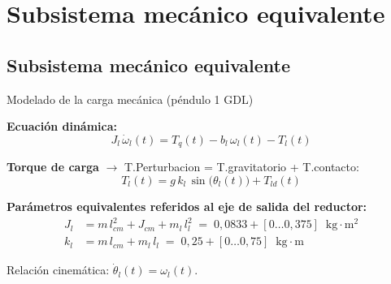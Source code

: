 \documentclass[aspectratio=169,t]{beamer}
\newcommand{\SecPresentacion}{Presentación del problema}
\newcommand{\SecMecanico}{Subsistema mecánico equivalente}
\newcommand{\SecElectromagnetico}{Subsistema electromagnético en coordenadas qd0}
\newcommand{\SecTermico}{Subsistema térmico}
\newcommand{\SecNLGlobal}{Sistema No Lineal Global}
\newcommand{\SecLPV}{Linealización Jacobiana (LPV)}
\newcommand{\SecLTI}{Obtención del modelo LTI equivalente}
\newcommand{\SecAnalisisLTI}{Análisis del modelo LTI aumentado}
\newcommand{\SecDinamica}{Respuesta dinámica en dominio del tiempo}
\newcommand{\SecControlador}{Diseño y análisis del controlador en cascada}
\newcommand{\SecVerifSpecs}{Verificación de desempeño: Especificaciones de operación}
\newcommand{\SecVerifOffset}{Verificación de desempeño: Offset de estado estacionario}
\newcommand{\SecVerifNoIdealidades}{Verificación de desempeño: No idealidades y comportamiento térmico}
\newcommand{\SecDiscretizacion}{Discretización del controlador}
\newcommand{\SecSoftware}{Codificación del software de control}
\newcommand{\AgendaItem}[3]{%
  \ifnum#1=#2
    {\scriptsize\bfseries\color{uncBlue}%
      \hyperlink{sec:#1}{\makebox[2.2em][r]{#1.}\hspace{0.7em}%
      \parbox[t]{0.86\textwidth}{#3}}\par}%
  \else
    {\scriptsize\color{black!26}%
      \hyperlink{sec:#1}{\makebox[2.2em][r]{#1.}\hspace{0.7em}%
      \parbox[t]{0.86\textwidth}{#3}}\par}%
  \fi
  \vspace{0.35mm}%
}
\newcommand{\AgendaBody}[1]{%
    \vspace{3mm}
    {\Large\bfseries\color{uncBlue}Tabla de contenidos\par}
    \vspace{2mm}
    \begin{minipage}{0.94\textwidth}
      \AgendaItem{1}{#1}{\SecPresentacion}
      \AgendaItem{2}{#1}{\SecMecanico}
      \AgendaItem{3}{#1}{\SecElectromagnetico}
      \AgendaItem{4}{#1}{\SecTermico}
      \AgendaItem{5}{#1}\SecNLGlobal
      \AgendaItem{6}{#1}{\SecLPV}
      \AgendaItem{7}{#1}{\SecLTI}
      \AgendaItem{8}{#1}{\SecAnalisisLTI}
      \AgendaItem{9}{#1}{\SecDinamica}
      \AgendaItem{10}{#1}{\SecControlador}
      \AgendaItem{11}{#1}{\SecVerifSpecs}
      \AgendaItem{12}{#1}{\SecVerifOffset}
      \AgendaItem{13}{#1}{\SecVerifNoIdealidades}
      \AgendaItem{14}{#1}{\SecDiscretizacion}
      \AgendaItem{15}{#1}{\SecSoftware}
    \end{minipage}
    \vfill
}
\newcommand{\AgendaSlideTarget}[2]{%
  \begin{frame}[plain]
    \hypertarget{#2}{}%
    \AgendaBody{#1}
  \end{frame}
}
\newcommand{\StartProjectSection}[2]{%
  \section{#2}%
  \subsection{#2}%
  \AgendaSlideTarget{#1}{sec:#1}%
}
\begin{document}

\StartProjectSection{2}{\SecMecanico}

\begin{frame}{Modelado de la carga mecánica (péndulo 1 GDL)}
\vspace{3mm}

\textbf{Ecuación dinámica:}
\begin{equation*}
J_l\,\dot{\omega}_l(t) = T_q(t) - b_l\,\omega_l(t) - T_l(t)
\end{equation*}

\textbf{Torque de carga} $\rightarrow$ T.Perturbacion = T.gravitatorio + T.contacto:
\begin{equation*}
T_l(t) = g\,k_l\,\sin\!\big(\theta_l(t)\big) + T_{ld}(t)
\end{equation*}

\textbf{Parámetros equivalentes referidos al eje de salida del reductor:}
\begin{align*}
J_l &= m\,l_{cm}^2 + J_{cm} + m_l\,l_l^2 \;=\; 0{,}0833 + [0\dots 0{,}375]\;\;\text{kg}\cdot\text{m}^2 \\
k_l &= m\,l_{cm} + m_l\,l_l \;=\; 0{,}25 + [0\dots 0{,}75]\;\;\text{kg}\cdot\text{m}
\end{align*}

\vspace{1mm}
{\small Relación cinemática: $\dot{\theta}_l(t)=\omega_l(t)$.}
\end{frame}
\end{document}
